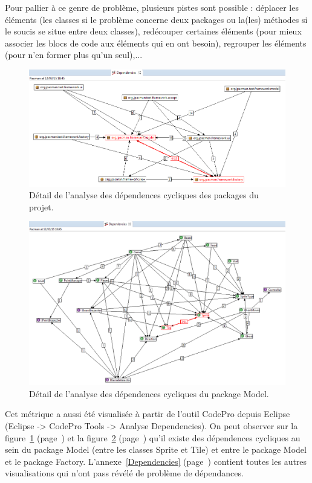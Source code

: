 \documentclass[12pt,a4paper,final]{article}
\newcommand{\annexe}[1]{annexe~\ref{#1} (page~\pageref{#1})}
\newcommand{\labelfigure}[1]{figure~\ref{#1} (page~\pageref{#1})}
\begin{document}
Pour pallier à ce genre de problème, plusieurs pistes sont possible : déplacer les éléments (les classes si le problème concerne deux packages ou la(les) méthodes si le soucis se situe entre deux classes), redécouper certaines éléments (pour mieux associer les blocs de code aux éléments qui en ont besoin), regrouper les éléments (pour n'en former plus qu'un seul),... %

\begin{figure}[!h]
	\centering
	\includegraphics[width=\textwidth]{DependenciesPackages.png}
	\caption{\label{dependenciesPackage}Détail de l'analyse des dépendences cycliques des packages du projet.}
\end{figure}
\begin{figure}[!h]
	\centering
	\includegraphics[width=\textwidth]{DependenciesModel.png}
	\caption{\label{dependenciesModel}Détail de l'analyse des dépendences cycliques du package Model.}
\end{figure}

Cet métrique a aussi été visualisée à partir de l'outil CodePro depuis Eclipse (Eclipse -> CodePro Tools -> Analyse Dependencies).
On peut observer sur la \labelfigure{dependenciesPackage} et la \labelfigure{dependenciesModel} qu'il existe des dépendences cycliques au sein du package Model (entre les classes Sprite et Tile) et entre le package Model et le package Factory.
L'\annexe{Dependencies} contient toutes les autres visualisations qui n'ont pass révélé de problème de dépendances.
\end{document}
